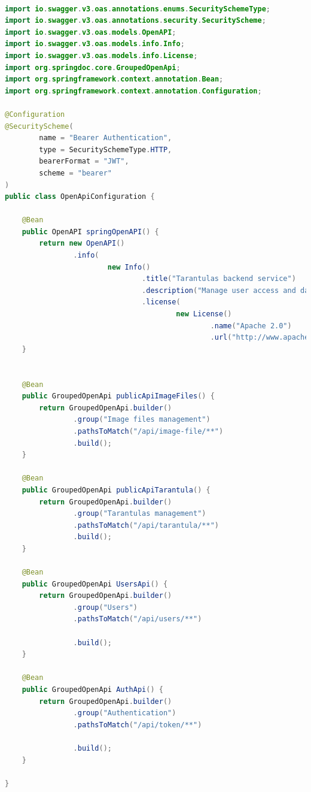\documentclass[a4paper,12pt,oneside]{article}
\begin{document}
\begin{lstlisting}[language=Java]

import io.swagger.v3.oas.annotations.enums.SecuritySchemeType;
import io.swagger.v3.oas.annotations.security.SecurityScheme;
import io.swagger.v3.oas.models.OpenAPI;
import io.swagger.v3.oas.models.info.Info;
import io.swagger.v3.oas.models.info.License;
import org.springdoc.core.GroupedOpenApi;
import org.springframework.context.annotation.Bean;
import org.springframework.context.annotation.Configuration;

@Configuration
@SecurityScheme(
        name = "Bearer Authentication",
        type = SecuritySchemeType.HTTP,
        bearerFormat = "JWT",
        scheme = "bearer"
)
public class OpenApiConfiguration {

    @Bean
    public OpenAPI springOpenAPI() {
        return new OpenAPI()
                .info(
                        new Info()
                                .title("Tarantulas backend service")
                                .description("Manage user access and data, add and manage tarantulas and image files")
                                .license(
                                        new License()
                                                .name("Apache 2.0")
                                                .url("http://www.apache.org/licenses/LICENSE-2.0")));
    }


    @Bean
    public GroupedOpenApi publicApiImageFiles() {
        return GroupedOpenApi.builder()
                .group("Image files management")
                .pathsToMatch("/api/image-file/**")
                .build();
    }

    @Bean
    public GroupedOpenApi publicApiTarantula() {
        return GroupedOpenApi.builder()
                .group("Tarantulas management")
                .pathsToMatch("/api/tarantula/**")
                .build();
    }

    @Bean
    public GroupedOpenApi UsersApi() {
        return GroupedOpenApi.builder()
                .group("Users")
                .pathsToMatch("/api/users/**")

                .build();
    }

    @Bean
    public GroupedOpenApi AuthApi() {
        return GroupedOpenApi.builder()
                .group("Authentication")
                .pathsToMatch("/api/token/**")

                .build();
    }

}


\end{lstlisting}
\end{document}
